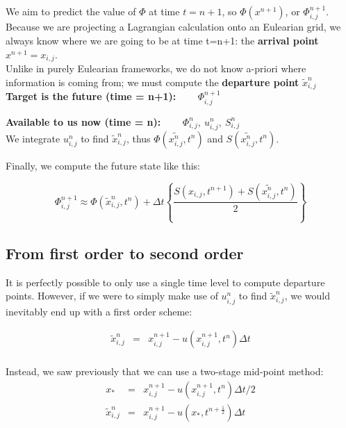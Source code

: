 We aim to predict the value of $\Phi$ at time $t= n+1$, so $\Phi(x^{n+1})$, or $\Phi^{n+1}_{i,j}$. \\
			
Because we are projecting a Lagrangian calculation onto an Eulearian grid, we always know where we are going to be at time t=n+1: the \textbf{arrival point} $x^{n+1}=x_{i,j}$. \\
			
Unlike in purely Eulearian frameworks, we do not know a-priori where information is coming from; we must compute the \textbf{departure point} $\tilde{x}^n_{i,j}$\\
						
{\bf Target is the future (time = n+1): ~ ~ }  $\Phi^{n+1}_{i,j}$ \\
			
\medskip
			
{\bf Available to us now (time = n):  ~ ~ }  $\Phi^n_{i,j}, ~ u^n_{i,j}, ~ S^n_{i,j}$ \\
			
We integrate ${u}^n_{i,j}$ to find $\tilde{x}^n_{i,j}$, thus $\Phi (\tilde{x_{i,j}^n},t^{n})$ and $S(\tilde{x_{i,j}^n},t^{n})$.
			
Finally, we compute the future state like this: 

\begin{equation}
			\Phi^{n+1}_{i,j}  \approx  \Phi(\tilde{x}^n_{i,j}, t^n) 
			+ \Delta t \left\{ \frac{S(x_{i,j},t^{n+1}) + S (\tilde{x_{i,j}^n},t^{n})}{2}\right\} 
\end{equation}


\subsection{From first order to second order}

	
	It is perfectly possible to only use a single time level to compute departure points. However, if we were to simply make use of $u^n_{i,j}$ to find $\tilde{x}^n_{i,j}$, we would inevitably end up with a first order scheme:
	
	\begin{eqnarray*}
		\tilde{x}^n_{i,j} & = & x^{n+1}_{i,j}-u(x^{n+1}_{i,j},t^n) \Delta t \\
	\end{eqnarray*}
		
	Instead, we saw previously that we can use a two-stage mid-point method:
	\begin{eqnarray*}
		x_* & = & x^{n+1}_{i,j}-u(x^{n+1}_{i,j},t^n) \Delta t/2 \\
		\tilde{x}^n_{i,j} & = & x^{n+1}_{i,j}-u(x_*,t^{n+\frac{1}{2}}) \Delta t
	\end{eqnarray*}
	
